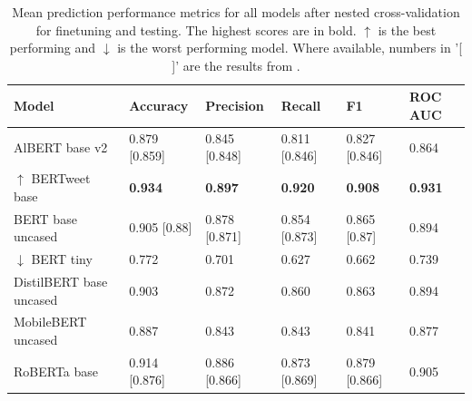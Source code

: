 \begin{table}[htbp]
    \centering
    \small %
    \begin{tabularx}{\textwidth}{|X|X|X|X|X|X|}
        \hline
        \rowcolor[gray]{0.7}
        \textbf{Model}                         & \textbf{Accuracy} & \textbf{Precision} & \textbf{Recall} & \textbf{F1}    & \textbf{ROC AUC} \\
        \hline
        AlBERT base v2                         & 0.879 [0.859]     & 0.845 [0.848]      & 0.811 [0.846]   & 0.827 [0.846]  & 0.864            \\
        \rowcolor[gray]{0.9}
        \(\uparrow\) BERTweet base             & \textbf{0.934}    & \textbf{0.897}     & \textbf{0.920}  & \textbf{0.908} & \textbf{0.931}   \\
        BERT base uncased                      & 0.905 [0.88]      & 0.878  [0.871]     & 0.854  [0.873]  & 0.865 [0.87]   & 0.894            \\
        \rowcolor[gray]{0.9}
        \(\downarrow\) BERT tiny \vspace{10pt} & 0.772             & 0.701              & 0.627           & 0.662          & 0.739            \\
        DistilBERT base uncased                & 0.903             & 0.872              & 0.860           & 0.863          & 0.894            \\
        \rowcolor[gray]{0.9}
        MobileBERT uncased                     & 0.887             & 0.843              & 0.843           & 0.841          & 0.877            \\
        RoBERTa base                           & 0.914 [0.876]     & 0.886 [0.866]      & 0.873 [0.869]   & 0.879 [0.866]  & 0.905            \\
        \hline
    \end{tabularx}
    \caption{Mean prediction performance metrics for all models after nested cross-validation for finetuning and testing. The highest scores are in bold. \(\uparrow\) is the best performing and \(\downarrow\) is the worst performing model. Where available, numbers in '[ ]' are the results from \cite{jin_complaint_2020}.}
    \label{tab: model_mean_metrics}
\end{table}

